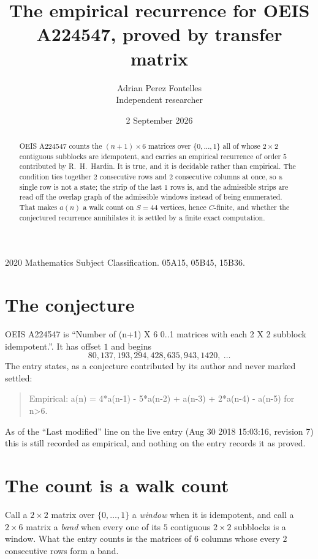 \documentclass[11pt,a4paper]{article}
\title{The empirical recurrence for OEIS A224547, proved by transfer matrix}
\author{Adrian Perez Fontelles\\ \small Independent researcher}
\date{2 September 2026}
\theoremstyle{plain}
\theoremstyle{definition}
\begin{document}
\maketitle

\begin{abstract}
OEIS A224547 counts the $(n+1)\times6$ matrices over $\{0,\dots,1\}$ all of whose
$2\times2$ contiguous subblocks are idempotent, and carries an empirical recurrence of order
$5$ contributed by R.~H.~Hardin. It is true, and it is decidable rather than empirical.
The condition ties together $2$ consecutive rows and $2$ consecutive columns at once, so a
single row is not a state; the strip of the last $1$ rows is, and the admissible strips
are read off the overlap graph of the admissible windows instead of being enumerated. That
makes $a(n)$ a walk count on $S=44$ vertices, hence $C$-finite, and whether the conjectured
recurrence annihilates it is settled by a finite exact computation.
\end{abstract}

\noindent\small 2020 Mathematics Subject Classification. 05A15, 05B45, 15B36.\normalsize

\section{The conjecture}

OEIS A224547 is ``Number of (n+1) X 6 0..1 matrices with each 2 X 2 subblock idempotent.''. It has offset $1$ and begins
\[
80, 137, 193, 294, 428, 635, 943, 1420,\ \dots
\]
The entry states, as a conjecture contributed by its author and never marked settled:
\begin{quote}
Empirical: a(n) = 4*a(n-1) - 5*a(n-2) + a(n-3) + 2*a(n-4) - a(n-5) for n>6.
\end{quote}
As of the ``Last modified'' line on the live entry (Aug 30 2018 15:03:16, revision 7) this is still
recorded as empirical, and nothing on the entry records it as proved.

\section{The count is a walk count}

Call a $2\times2$ matrix over $\{0,\dots,1\}$ a \emph{window} when it is idempotent, and
call a $2\times6$ matrix a \emph{band} when every one of its $5$ contiguous
$2\times2$ subblocks is a window. What the entry counts is the matrices of $6$ columns
whose every $2$ consecutive rows form a band.
\end{document}
